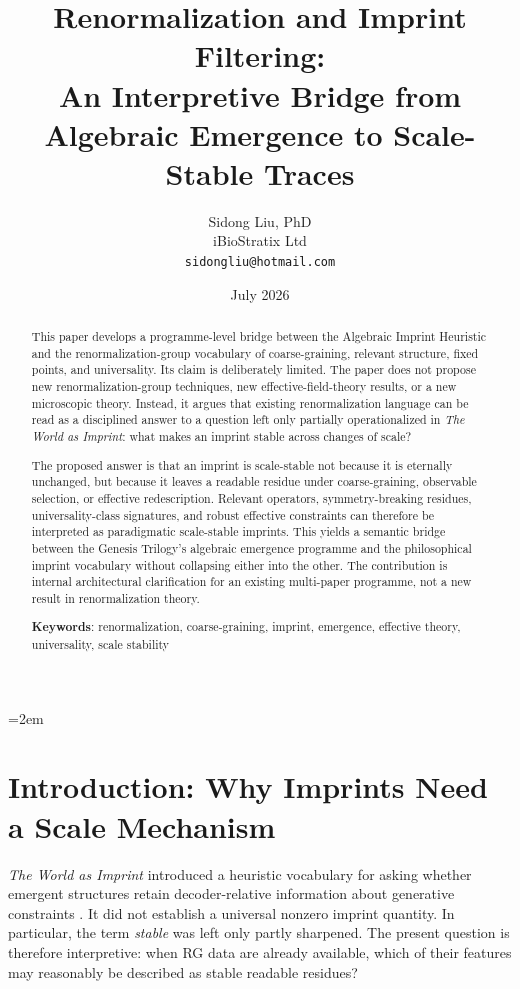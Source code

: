 \documentclass[12pt,a4paper]{article}
\title{Renormalization and Imprint Filtering:\\
An Interpretive Bridge from Algebraic Emergence to Scale-Stable Traces}
\author{
  Sidong Liu, PhD \\
  iBioStratix Ltd \\
  \texttt{sidongliu@hotmail.com}
}
\date{July 2026}
\begin{document}
\emergencystretch=2em
\raggedbottom
{}

\maketitle

\begin{abstract}
This paper develops a programme-level bridge between the Algebraic Imprint Heuristic and the renormalization-group vocabulary of coarse-graining, relevant structure, fixed points, and universality. Its claim is deliberately limited. The paper does not propose new renormalization-group techniques, new effective-field-theory results, or a new microscopic theory. Instead, it argues that existing renormalization language can be read as a disciplined answer to a question left only partially operationalized in \emph{The World as Imprint}: what makes an imprint stable across changes of scale?

The proposed answer is that an imprint is scale-stable not because it is eternally unchanged, but because it leaves a readable residue under coarse-graining, observable selection, or effective redescription. Relevant operators, symmetry-breaking residues, universality-class signatures, and robust effective constraints can therefore be interpreted as paradigmatic scale-stable imprints. This yields a semantic bridge between the Genesis Trilogy's algebraic emergence programme and the philosophical imprint vocabulary without collapsing either into the other. The contribution is internal architectural clarification for an existing multi-paper programme, not a new result in renormalization theory.

\medskip

\noindent\textbf{Keywords}: renormalization, coarse-graining, imprint, emergence, effective theory, universality, scale stability
\end{abstract}

\section{Introduction: Why Imprints Need a Scale Mechanism}

\emph{The World as Imprint} introduced a heuristic vocabulary for asking
whether emergent structures retain decoder-relative information about
generative constraints \cite{WorldImprint}. It did not establish a
universal nonzero imprint quantity. In particular, the term
\emph{stable} was left only partly sharpened. The present question is
therefore interpretive: when RG data are already available, which of
their features may reasonably be described as stable readable residues?
\end{document}
